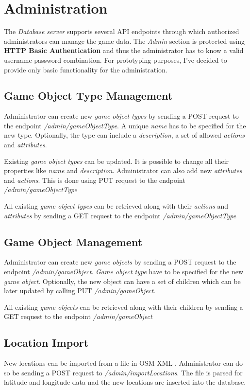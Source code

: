 \section{Administration}
The \textit{Database server} supports several API endpoints through which authorized administrators can manage the game data. The \textit{Admin} section is protected using \textbf{HTTP Basic Authentication} and thus the administrator has to know a valid username-password combination. For prototyping purposes, I've decided to provide only basic functionality for the administration.

	\subsection{Game Object Type Management}
	Administrator can create new \textit{game object types} by sending a POST request to the endpoint \mbox{\textit{/admin/gameObjectType}}. A unique \textit{name} has to be specified for the new type. Optionally, the type can include a \textit{description}, a set of allowed \textit{actions} and \textit{attributes}.
	
	Existing \textit{game object types} can be updated. It is possible to change all their properties like \textit{name} and \textit{description}. Administrator can also add new \textit{attributes} and \textit{actions}. This is done using PUT request to the endpoint \mbox{\textit{/admin/gameObjectType}}
		
	All existing \textit{game object types} can be retrieved along with their \textit{actions} and \textit{attributes} by sending a GET request to the endpoint \mbox{\textit{/admin/gameObjectType}}
	
	\subsection{Game Object Management}
	Administrator can create new \textit{game objects} by sending a POST request to the endpoint \mbox{\textit{/admin/gameObject}}. \textit{Game object type} have to be specified for the new \textit{game object}. Optionally, the new object can have a set of children which can be later updated by calling PUT \mbox{\textit{/admin/gameObject}}.
	
	All existing \textit{game objects} can be retrieved along with their children by sending a GET request to the endpoint \mbox{\textit{/admin/gameObject}}
	
	\subsection{Location Import}
	New locations can be imported from a file in OSM XML \cite{osmxml}. Administrator can do so be sending a POST request to \mbox{\textit{/admin/importLocations}}. The file is parsed for latitude and longitude data nad the new locations are inserted into the database.
	
